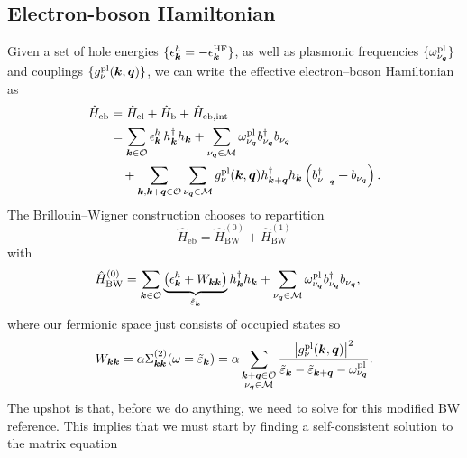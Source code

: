 \subsection{Electron-boson Hamiltonian}
Given a set of hole energies $\{\epsilon_{\bm{k}}^{h}=-\epsilon_{\bm{k}}^{\rm HF}\}$, as well as plasmonic frequencies $\{\omega_{\nu_{\bm{q}}}^{\rm pl}\}$ and couplings $\{g_{\nu}^{\rm pl}(\bm{k},\bm{q})\}$, we can write the effective electron--boson Hamiltonian as
\begin{align}
\hat{H}_{\mathrm{eb}}
&=
\hat{H}_{\mathrm{el}}
+
\hat{H}_{\mathrm{b}}
+
\hat{H}_{\mathrm{eb,int}}
\\
&=
\sum_{\bm{k}\in\mathcal{O}}
\epsilon_{\bm{k}}^{h}\,
h_{\bm{k}}^\dagger h_{\bm{k}}
+
\sum_{\nu_{\bm{q}}\in\mathcal{M}}
\omega_{\nu_{\bm{q}}}^{\rm pl}
b_{\nu_{\bm{q}}}^{\dagger}
b_{\nu_{\bm{q}}}
\nonumber\\
&\quad
+
\sum_{\bm{k},\bm{k}+\bm{q}\in\mathcal{O}}
\sum_{\nu_{\bm{q}}\in\mathcal{M}}
g_{\nu}^{\rm pl}(\bm{k},\bm{q})
h_{\bm{k}+\bm{q}}^{\dagger}
h_{\bm{k}}
\left(
b_{\nu_{-\bm{q}}}^{\dagger}
+
b_{\nu_{\bm{q}}}
\right).
\label{eq:eb_hamiltonian}
\end{align}
The Brillouin--Wigner construction chooses to repartition
\begin{equation}
    \hat{H}_{\mathrm{eb}}
    =
    \hat{H}_{\mathrm{BW}}^{(0)}
    +
    \hat{H}_{\mathrm{BW}}^{(1)}
\end{equation}
with
\begin{align}
\hat{H}_{\mathrm{BW}}^{(0)}
&=
\sum_{\bm{k}\in\mathcal{O}}
\underbrace{\left(\epsilon_{\bm{k}}^{h} + W_{\bm{k}\bm{k}}\right)}_{\tilde{\varepsilon}_{\bm{k}}}
h_{\bm{k}}^\dagger h_{\bm{k}}
+
\sum_{\nu_{\bm{q}}\in\mathcal{M}}
\omega_{\nu_{\bm{q}}}^{\rm pl}
b_{\nu_{\bm{q}}}^{\dagger}
b_{\nu_{\bm{q}}},
\end{align}
where our fermionic space just consists of occupied states so
\begin{equation}
    {W}_{\bm{k}\bm{k}} = \alpha \Sigma^{(2)}_{\bm{k}\bm{k}}(\omega=\tilde{\varepsilon}_{\bm{k}}) = \alpha \sum_{\substack{\bm{k}+\bm{q}\in\mathcal{O}\\\nu_{\bm{q}}\in\mathcal{M}}} \frac{\left|g_{\nu}^{\rm pl}(\bm{k},\bm{q})\right|^2}{\tilde{\varepsilon}_{\bm{k}}-\tilde{\varepsilon}_{\bm{k}+\bm{q}}-\omega_{\nu_{\bm{q}}}^{\rm pl}}.
\end{equation}
{The upshot is that, before we do anything, we need to solve for this modified BW reference. }This implies that we must start by finding a self-consistent solution to the matrix equation

